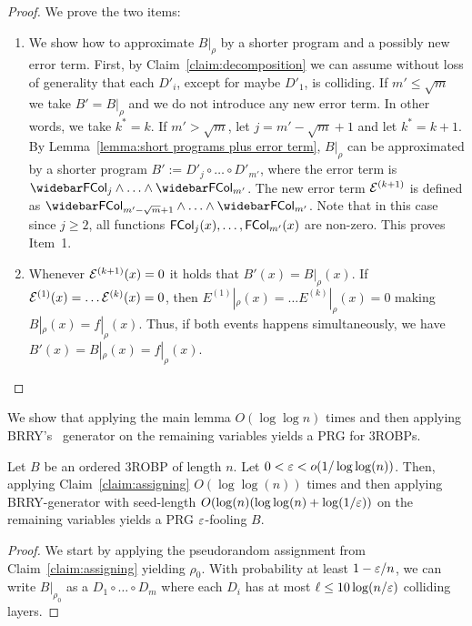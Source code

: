 {\begin{proof}
We prove the two items:
\begin{enumerate}
\item
We show how to approximate $B|_{\rho}$ by a shorter program and a possibly new error term. 
First, by Claim~\ref{claim:decomposition} we can assume without loss of generality that each $D'_{i}$, except for maybe $D'_1$, is colliding.
If $m'\le \sqrt{m}$ we take $B' = B|_{\rho}$ and we do not introduce any new error term. In other words, we take $k^{*} = k$. 
If $m'> \sqrt{m}$, let $j = m'-\sqrt{m}+1$ and let $k^{*} = k+1$.
By Lemma~\ref{lemma:short programs plus error term}, $B|_{\rho}$ can be approximated by a shorter program $B' := D'_{j} \circ \ldots \circ D'_{m'}$, where the error term is $\bar{\FCol_{j}} \wedge \ldots \wedge \bar{\FCol_{m'}}$.
The new error term ${\mathcal{E}}^{(k+1)}$ is defined as  $\bar{\FCol_{m'-\sqrt{m}+1}} \wedge \ldots \wedge \bar{\FCol_{m'}}$.
Note that in this case since $j\ge 2$, all functions ${\mathsf{FCol}}_{j}(x), \ldots, {\mathsf{FCol}}_{m'}(x)$ are non-zero.
This proves Item~1.
\item Whenever ${\mathcal{E}}^{(k+1)}(x)=0$ it holds that $B'(x) = B|_{\rho}(x)$. If ${\mathcal{E}}^{(1)}(x) = \ldots {\mathcal{E}}^{(k)}(x) = 0$, then $E^{(1)}|_{\rho}(x) =  \ldots E^{(k)}|_{\rho}(x) = 0$ making $B|_{\rho}(x) = f|_\rho(x)$. Thus, if both events happens simultaneously, we have  $B'(x) = B|_{\rho}(x) = f|_{\rho}(x)$.\qedhere
\end{enumerate}
\end{proof}

We show that applying the main lemma $O(\log \log n)$ times and then applying BRRY's~\cite{BravermanRRY10} generator on the remaining variables yields a PRG for 3ROBPs.

\begin{theorem}\label{thm:main-3ROBP-ordered}
Let $B$ be an ordered 3ROBP of length $n$. Let $0<\varepsilon < o(1/\log\log(n))$.
Then, applying Claim~\ref{claim:assigning} $O(\log\log(n))$ times and then applying BRRY-generator with seed-length 
$O(\log(n)(\log \log (n) +  \log(1/\varepsilon))$
 on the remaining variables yields a PRG $\varepsilon$-fooling $B$.
\end{theorem}
\begin{proof}
We start by applying the pseudorandom assignment from Claim~\ref{claim:assigning} yielding $\rho_0$.
With  probability at least $1-\varepsilon/n$, we can write $B|_{\rho_0}$ as a $D_1 \circ \ldots \circ D_m$ where each $D_i$ has at most $\ell \le 10 \log(n/\varepsilon)$ colliding layers. 


\end{proof}}
